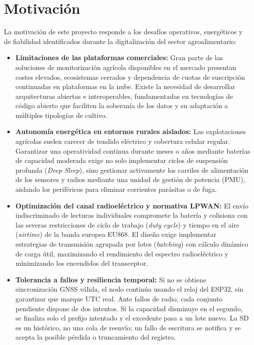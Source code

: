 \section{Motivación}
La motivación de este proyecto responde a los desafíos operativos, energéticos y de fiabilidad identificados durante la digitalización del sector agroalimentario:

\begin{itemize}
    \item \textbf{Limitaciones de las plataformas comerciales:} Gran parte de las soluciones de monitorización agrícola disponibles en el mercado presentan costes elevados, ecosistemas cerrados y dependencia de cuotas de suscripción continuadas en plataformas en la nube. Existe la necesidad de desarrollar arquitecturas abiertas e interoperables, fundamentadas en tecnologías de código abierto que faciliten la soberanía de los datos y su adaptación a múltiples tipologías de cultivo.

    \item \textbf{Autonomía energética en entornos rurales aislados:} Las explotaciones agrícolas suelen carecer de tendido eléctrico y cobertura celular regular. Garantizar una operatividad continua durante meses o años mediante baterías de capacidad moderada exige no solo implementar ciclos de suspensión profunda (\textit{Deep Sleep}), sino gestionar activamente los carriles de alimentación de los sensores y radios mediante una unidad de gestión de potencia (PMU), aislando los periféricos para eliminar corrientes parásitas o de fuga.

    \item \textbf{Optimización del canal radioeléctrico y normativa LPWAN:} El envío indiscriminado de lecturas individuales compromete la batería y colisiona con las severas restricciones de ciclo de trabajo (\textit{duty cycle}) y tiempo en el aire (\textit{airtime}) de la banda europea EU868. El diseño exige implementar estrategias de transmisión agrupada por lotes (\textit{batching}) con cálculo dinámico de carga útil, maximizando el rendimiento del espectro radioeléctrico y minimizando los encendidos del transceptor.

    \item \textbf{Tolerancia a fallos y resiliencia temporal:} Si no se obtiene sincronización GNSS válida, el nodo continúa usando el reloj del ESP32, sin garantizar que marque UTC real. Ante fallos de radio, cada conjunto pendiente dispone de dos intentos. Si la capacidad disminuye en el segundo, se finaliza solo el prefijo intentado y el excedente pasa a un lote nuevo. La SD es un histórico, no una cola de reenvío; un fallo de escritura se notifica y se acepta la posible pérdida o truncamiento del registro.


\end{itemize}
